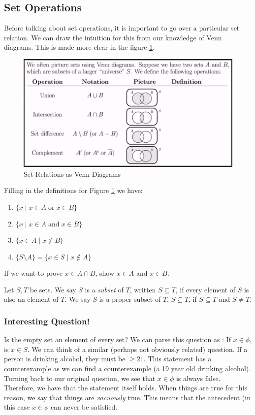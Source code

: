 \subsection{Set Operations}
Before talking about set operations, it is important to go over a particular set relation. We can draw the intuition for this from our knowledge of Venn diagrams. This is made more clear in the figure \ref{fig:sets}.
\begin{figure}[h]
    \centering
    \includegraphics[scale=.4]{notes/images/set-relations.PNG}
    \caption{Set Relations as Venn Diagrams}
    \label{fig:sets}
\end{figure}
Filling in the definitions for Figure \ref{fig:sets} we have:
\begin{enumerate}
    \item $\{x \mid x \in A \; \text{or} \; x \in B\}$
    \item $\{x \mid x \in A \; \text{and} \; x \in B\}$
    \item $\{x \in A \mid x \not\in B\}$
    \item $\{S\setminus A\} = \{x \in S \mid x \not\in A\}$
\end{enumerate}
If we want to prove $x \in A \cap B$, show $x \in A$ and $x \in B$.
\begin{definition}
Let $S, T$ be sets. We say $S$ is a \textit{subset} of $T$, written $S \subseteq T$, if every element of $S$ is also an element of $T$. We say $S$ is a proper subset of $T$, $S \subsetneq T$, if $S \subseteq T$ and $S \neq T$. 
\end{definition}
\subsubsection{Interesting Question!}
Is the empty set an element of every set? We can parse this question as : If $x \in \phi$, is $x \in S$. We can think of a similar (perhaps not obviously related) question. If a person is drinking alcohol, they must be $\geq 21$. This statement has a counterexample as we can find a counterexample (a 19 year old drinking alcohol). Turning back to our original question, we see that $x \in \phi$ is always false. Therefore, we have that the statement itself holds. When things are true for this reason, we say that things are \textit{vacuously} true. This means that the antecedent (in this case $x \in \phi$ can never be satisfied. 
